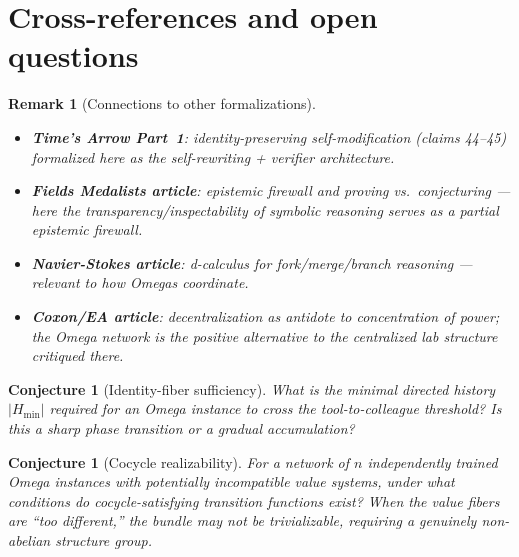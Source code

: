 \documentclass[11pt,a4paper]{article}
\newtheorem{conjecture}[definition]{Conjecture}
\newtheorem{remark}[definition]{Remark}
\begin{document}
\section{Cross-references and open questions}

\begin{remark}[Connections to other formalizations]
\begin{itemize}
\item \textbf{Time's Arrow Part~1}: identity-preserving self-modification
  (claims 44--45) formalized here as the self-rewriting + verifier
  architecture.
\item \textbf{Fields Medalists article}: epistemic firewall and proving
  vs.\ conjecturing --- here the transparency/inspectability of symbolic
  reasoning serves as a partial epistemic firewall.
\item \textbf{Navier-Stokes article}: d-calculus for fork/merge/branch
  reasoning --- relevant to how Omegas coordinate.
\item \textbf{Coxon/EA article}: decentralization as antidote to
  concentration of power; the Omega network is the positive alternative
  to the centralized lab structure critiqued there.
\end{itemize}
\end{remark}

\begin{conjecture}[Identity-fiber sufficiency]
What is the minimal directed history $|H_{\min}|$ required for an
Omega instance to cross the tool-to-colleague threshold? Is this a
sharp phase transition or a gradual accumulation?
\end{conjecture}

\begin{conjecture}[Cocycle realizability]
For a network of $n$ independently trained Omega instances with
potentially incompatible value systems, under what conditions do
cocycle-satisfying transition functions exist? When the value
fibers are ``too different,'' the bundle may not be trivializable,
requiring a genuinely non-abelian structure group.
\end{conjecture}
\end{document}
